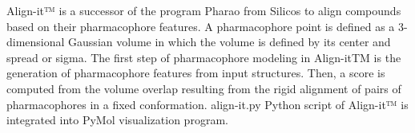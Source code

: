 Align-it™ is a successor of the program Pharao from Silicos to align compounds based on their pharmacophore features. A pharmacophore point is defined as a 3-dimensional Gaussian volume in which the volume is defined by its center and spread or sigma.
The first step of pharmacophore modeling in Align-itTM is the generation of pharmacophore features from input structures. Then, a score is computed from the volume overlap resulting from the rigid alignment of pairs of pharmacophores in a fixed conformation. align-it.py Python script of Align-it™ is integrated into PyMol visualization program.
